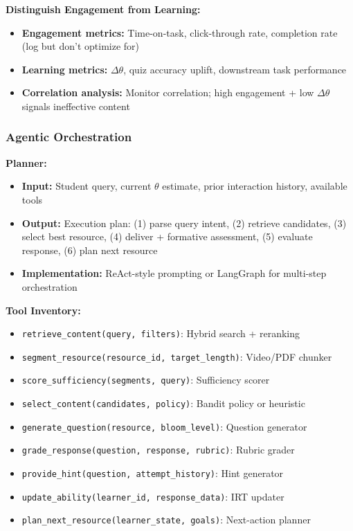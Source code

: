\documentclass[11pt,letterpaper]{article}
\begin{document}
\textbf{Distinguish Engagement from Learning:}
\begin{itemize}
\item \textbf{Engagement metrics:} Time-on-task, click-through rate, completion rate (log but don't optimize for)
\item \textbf{Learning metrics:} $\Delta\theta$, quiz accuracy uplift, downstream task performance
\item \textbf{Correlation analysis:} Monitor correlation; high engagement + low $\Delta\theta$ signals ineffective content
\end{itemize}

\subsubsection{Agentic Orchestration}\label{subsubsec:agentic-orchestration}

\textbf{Planner:}
\begin{itemize}
\item \textbf{Input:} Student query, current $\theta$ estimate, prior interaction history, available tools
\item \textbf{Output:} Execution plan: (1) parse query intent, (2) retrieve candidates, (3) select best resource, (4) deliver + formative assessment, (5) evaluate response, (6) plan next resource
\item \textbf{Implementation:} ReAct-style prompting or LangGraph for multi-step orchestration
\end{itemize}

\textbf{Tool Inventory:}
\begin{itemize}
\item \texttt{retrieve\_content(query, filters)}: Hybrid search + reranking
\item \texttt{segment\_resource(resource\_id, target\_length)}: Video/PDF chunker
\item \texttt{score\_sufficiency(segments, query)}: Sufficiency scorer
\item \texttt{select\_content(candidates, policy)}: Bandit policy or heuristic
\item \texttt{generate\_question(resource, bloom\_level)}: Question generator
\item \texttt{grade\_response(question, response, rubric)}: Rubric grader
\item \texttt{provide\_hint(question, attempt\_history)}: Hint generator
\item \texttt{update\_ability(learner\_id, response\_data)}: IRT updater
\item \texttt{plan\_next\_resource(learner\_state, goals)}: Next-action planner
\end{itemize}
\end{document}
